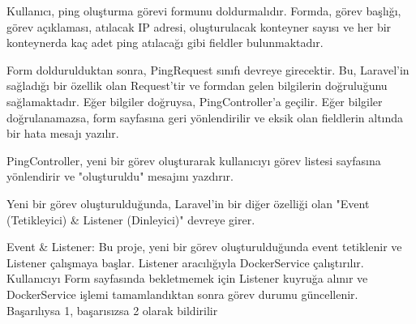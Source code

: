 Kullanıcı, ping oluşturma görevi formunu doldurmalıdır. Formda, görev başlığı, görev açıklaması, atılacak IP adresi, oluşturulacak konteyner sayısı ve her bir konteynerda kaç adet ping atılacağı gibi fieldler bulunmaktadır.

Form doldurulduktan sonra, PingRequest sınıfı devreye girecektir. Bu, Laravel'in sağladığı bir özellik olan Request'tir ve formdan gelen bilgilerin doğruluğunu sağlamaktadır. Eğer bilgiler doğruysa, PingController'a geçilir. Eğer bilgiler doğrulanamazsa, form sayfasına geri yönlendirilir ve eksik olan fieldlerin altında bir hata mesajı yazılır.

PingController, yeni bir görev oluşturarak kullanıcıyı görev listesi sayfasına yönlendirir ve "oluşturuldu" mesajını yazdırır.

Yeni bir görev oluşturulduğunda, Laravel'in bir diğer özelliği olan "Event (Tetikleyici) \& Listener (Dinleyici)" devreye girer.

Event \& Listener: Bu proje, yeni bir görev oluşturulduğunda event tetiklenir ve Listener çalışmaya başlar. Listener aracılığıyla DockerService çalıştırılır. Kullanıcıyı Form sayfasında bekletmemek için Listener kuyruğa alınır ve DockerService işlemi tamamlandıktan sonra görev durumu güncellenir. Başarılıysa 1, başarısızsa 2 olarak bildirilir
